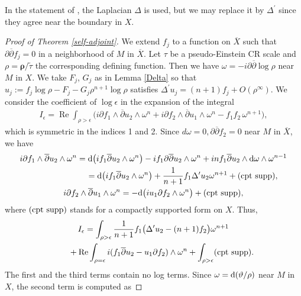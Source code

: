 \documentclass[pdftex]{sigma}
\numberwithin{equation}{section}
\begin{document}
In the statement of \cite[Lemma~4.4]{Hirachi}, the Laplacian $\Delta$ is used, but we may replace it by $\Delta^\prime$ since they agree near the boundary in $X$.


\begin{proof}[Proof of Theorem \ref{self-adjoint}]
We extend $f_j$ to a function on $\overline X$ such that $\partial\overline{\partial}f_j=0$ in a neighborhood of $M$ in $\overline X$. Let
$\tau$ be a pseudo-Einstein CR scale and $\rho=\boldsymbol\rho/\widetilde\tau$ the corresponding def\/ining function.
Then we have $\omega=-i\partial\overline{\partial}\log\rho$ near $M$ in $X$.
We take $F_j$, $G_j$ as in Lemma \ref{Delta} so that $u_j:=f_j\log\rho-F_j-G_j\rho^{n+1}\log\rho$ satisf\/ies $\Delta^\prime u_j=(n+1)f_j+O(\rho^\infty)$. We consider the coef\/f\/icient of $\log\epsilon$ in the expansion of the integral
\begin{gather*}
I_\epsilon=\operatorname{Re}\int_{\rho>\epsilon}\bigl(i\partial f_1\wedge \overline{\partial}u_2\wedge\omega^n+
i\partial f_2\wedge \overline{\partial}u_1\wedge\omega^n-f_1f_2\,\omega^{n+1}\bigr),
\end{gather*}
which is symmetric in the indices 1 and 2. Since $d\omega=0, \partial\overline{\partial}f_2=0$ near $M$ in $\overline X$, we have
\begin{gather*}
i\partial f_1 \wedge\overline{\partial}u_2\wedge\omega^n = {\rm d}\big(if_1\overline{\partial}u_2\wedge\omega^n\big) -if_1\partial\overline{\partial}u_2\wedge \omega^n+inf_1\overline{\partial}u_2\wedge {\rm d}\omega \wedge \omega^{n-1} \\
\hphantom{i\partial f_1 \wedge\overline{\partial}u_2\wedge\omega^n }{}
 ={\rm d}\big(if_1 \overline{\partial}u_2\wedge\omega^n\big)+\frac{1}{n+1}f_1\Delta^\prime u_2 \omega^{n+1}+({\rm cpt\ supp}), \\
i\partial f_2\wedge \overline{\partial}u_1\wedge\omega^n =-{\rm d}\big(iu_1\partial f_2\wedge\omega^n\big)+
({\rm cpt\ supp}),
\end{gather*}
where $({\rm cpt\ supp})$ stands for a compactly supported form on $X$. Thus,
\begin{gather*}
I_\epsilon=\int_{\rho>\epsilon}\frac{1}{n+1}f_1\bigl(\Delta^\prime u_2-(n+1)f_2\bigr)\omega^{n+1} \\
\hphantom{I_\epsilon=}{} +\operatorname{Re}\int_{\rho=\epsilon} i(f_1\overline{\partial}u_2-u_1\partial f_2)\wedge\omega^n
+\int_{\rho>\epsilon}({\rm cpt\ supp}).
\end{gather*}
The f\/irst and the third terms contain no log terms. Since $\omega={\rm d}(\vartheta/\rho)$ near $M$ in $X$, the second term is computed as

\end{proof}
\end{document}
